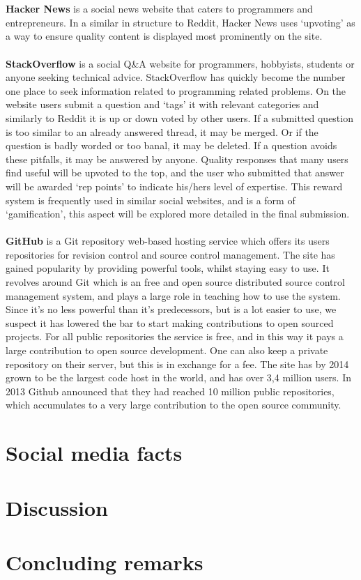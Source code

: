\documentclass[a4paper,11pt,oneside]{book} %
\begin{document}
\\\\
\textbf{Hacker News} is a social news website that caters to programmers and entrepreneurs. In a similar in structure to Reddit, Hacker News uses ‘upvoting’ as a way to ensure quality content is displayed most prominently on the site.
\\\\
\textbf{StackOverflow} is a social Q\&A website for programmers, hobbyists, students or anyone seeking technical advice. StackOverflow has quickly become the number one place to seek information related to programming related problems. On the website users submit a question and ‘tags’ it with relevant categories and similarly to Reddit it is up or down voted by other users. If a submitted question is too similar to an already answered thread, it may be merged. Or if the question is badly worded or too banal, it may be deleted. If a question avoids these pitfalls, it may be answered by anyone. Quality responses that many users find useful will be upvoted to the top, and the user who submitted that answer will be awarded ‘rep points’ to indicate his/hers level of expertise. This reward system is frequently used in similar social websites, and is a form of ‘gamification’, this aspect will be explored more detailed in the final submission.
\\\\
\textbf{GitHub} is a Git repository web-based hosting service which offers its users repositories for revision control and source control management. The site has gained popularity by providing powerful tools, whilst staying easy to use. It revolves around Git which is an free and open source distributed source control management system, and plays a large role in teaching how to use the system. Since it’s no less powerful than it’s predecessors, but is a lot easier to use, we suspect it has lowered the bar to start making contributions to open sourced projects. For all public repositories the service is free, and in this way it pays a large contribution to open source development. One can also keep a private repository on their server, but this is in exchange for a fee. The site has by 2014 grown to be the largest code host in the world, and has over 3,4 million users. In 2013 Github announced that they had reached 10 million public repositories, which accumulates to a very large contribution to the open source community.








\newpage{}

\chapter*{Social media facts}

\chapter*{Discussion}

\chapter*{Concluding remarks}

\backmatter

\printbibliography
 
\end{document}

